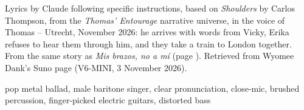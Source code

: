 
\label{sec:not-a-messenger}
\begin{notes}
Lyrics by Claude following specific instructions, based on \emph{Shoulders} by Carlos Thompson, from the \emph{Thomas' Entourage} narrative universe, in the voice of Thomas -- Utrecht, November 2026: he arrives with words from Vicky, Erika refuses to hear them through him, and they take a train to London together. From the same story as \emph{Mis brazos, no a mí} (page \pageref{sec:mis-brazos-no-a-mi}). Retrieved from Wyomee Dank's Suno page (V6-MINI, 3 November 2026).
\end{notes}
\begin{style}
pop metal ballad, male baritone singer, clear pronunciation, close-mic, brushed percussion, finger-picked electric guitars, distorted bass
\end{style}

